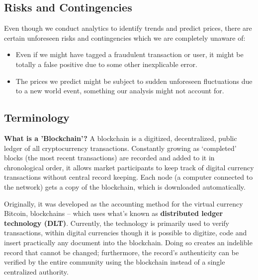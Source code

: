 \documentclass{article}
\begin{document}
\subsection{Risks and Contingencies}
Even though we conduct analytics to identify trends and predict prices, there are certain unforeseen risks and contingencies which we are completely unaware of:
\begin{itemize}
    \item Even if we might have tagged a fraudulent transaction or user, it might be totally a false positive due to some other inexplicable error.
    \item The prices we predict might be subject to sudden unforeseen fluctuations due to a new world event, something our analysis might not account for.
\end{itemize}

\subsection{Terminology}
\textbf{What is a 'Blockchain'?}
A blockchain is a digitized, decentralized, public ledger of all cryptocurrency transactions. Constantly growing as ‘completed’ blocks (the most recent transactions) are recorded and added to it in chronological order, it allows market participants to keep track of digital currency transactions without central record keeping. Each node (a computer connected to the network) gets a copy of the blockchain, which is downloaded automatically.

Originally, it was developed as the accounting method for the virtual currency Bitcoin, blockchains – which uses what's known as \textbf{distributed ledger technology (DLT)}. Currently, the technology is primarily used to verify transactions, within digital currencies though it is possible to digitize, code and insert practically any document into the blockchain. Doing so creates an indelible record that cannot be changed; furthermore, the record’s authenticity can be verified by the entire community using the blockchain instead of a single centralized authority.
\end{document}
